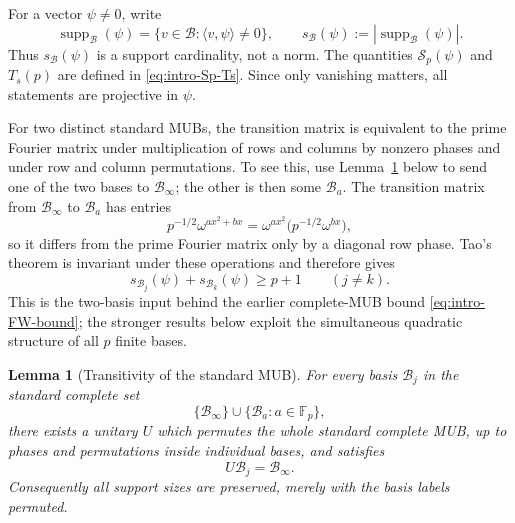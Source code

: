 \documentclass[11pt]{article}
\newtheorem{lemma}[theorem]{Lemma}
\newcommand{\F}{\mathbb F}
\newcommand{\supp}{\operatorname{supp}}
\begin{document}
For a vector $\psi\ne0$, write
\[
 \supp_{\mathcal B}(\psi)
 =\{v\in\mathcal B:\langle v,\psi\rangle\ne0\},
 \qquad
 s_{\mathcal B}(\psi):=|\supp_{\mathcal B}(\psi)|.
\]
Thus $s_{\mathcal B}(\psi)$ is a support cardinality, not a norm.
The quantities $\mathcal S_p(\psi)$ and $T_s(p)$ are defined in
\eqref{eq:intro-Sp-Ts}.  Since only vanishing matters, all statements are
projective in $\psi$.

For two distinct standard MUBs, the transition matrix is equivalent to the
prime Fourier matrix under multiplication of rows and columns by nonzero
phases and under row and column permutations.  To see this, use
Lemma~\ref{lem:standard-mub-transitivity} below to send one of the two bases
to \(\mathcal B_\infty\); the other is then some \(\mathcal B_a\).  The
transition matrix from \(\mathcal B_\infty\) to \(\mathcal B_a\) has entries
\[
 p^{-1/2}\omega^{ax^2+bx}
 =\omega^{ax^2}\bigl(p^{-1/2}\omega^{bx}\bigr),
\]
so it differs from the prime Fourier matrix only by a diagonal row phase.
Tao's theorem is invariant under these operations and therefore gives
\begin{equation}
 s_{\mathcal B_j}(\psi)
 +
 s_{\mathcal B_k}(\psi)
 \ge p+1
 \qquad(j\ne k).
 \label{eq:pairwise-MUB-support}
\end{equation}
This is the two-basis input behind the earlier complete-MUB bound
\eqref{eq:intro-FW-bound}; the stronger results below exploit the simultaneous
quadratic structure of all $p$ finite bases.

\begin{lemma}[Transitivity of the standard MUB]
\label{lem:standard-mub-transitivity}
For every basis \(\mathcal B_j\) in the standard complete set
\[
 \{\mathcal B_\infty\}\cup\{\mathcal B_a:a\in\F_p\},
\]
there exists a unitary \(U\) which permutes the whole standard complete
MUB, up to phases and permutations inside individual bases, and satisfies
\[
 U\mathcal B_j=\mathcal B_\infty.
\]
Consequently all support sizes are preserved, merely with the basis
labels permuted.
\end{lemma}
\end{document}
